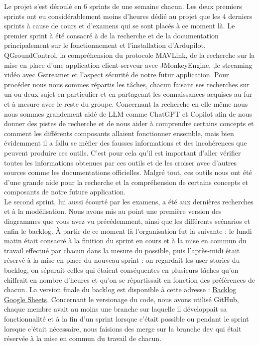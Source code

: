 \documentclass{scrartcl}
\begin{document}
Le projet s'est déroulé en 6 sprints de une semaine chacun. Les deux premiers sprints ont eu considérablement moins
d'heures dédié au projet que les 4 derniers sprints à cause de cours et d'examens qui se sont placés à ce moment là.
Le premier sprint à été consacré à de la recherche et de la documentation principalement sur le fonctionnement et l'installation d'Ardupilot, QGroundControl,
la compréhension du protocole MAVLink, de la recherche sur la mise en place d'une application client-serveur avec JMonkeyEngine,
,le streaming vidéo avec Gstreamer et l'aspect sécurité de notre futur application. Pour procéder nous nous sommes répartis les tâches, chacun faisant ses recherches
sur un ou deux sujet en particulier et en partageant les connaissances acquises au fur et à mesure avec le reste du groupe.
Concernant la recherche en elle même nous nous sommes grandement aidé de LLM comme ChatGPT et Copilot afin de nous donner des pistes de recherche et de
nous aider à comprendre certains concepts et comment les différents composants allaient fonctionner ensemble, mais bien évidemment il a fallu se méfier
des fausses informations et des incohérences que peuvent produire ces outils. C'est pour cela qu'il est important d'aller vérifier toutes les informations
obtenues par ces outils et de les croiser avec d'autres sources comme les documentations officielles.
Malgré tout, ces outils nous ont été d'une grande aide pour la recherche et la compréhension de certains concepts et composants de notre future application.\\

Le second sprint, lui aussi écourté par les examens, a été aux dernières recherches et à la modélisation. Nous avons mis au point
une première version des diagrammes que vous avez vu précédemment, ainsi que les différents scénarios et enfin le backlog.
À partir de ce moment là l'organisation fut la suivante : le lundi matin était consacré à la finition du sprint en cours
et à la mise en commun du travail effectué par chacun dans la mesure du possible, puis l'après-midi était réservé à la mise en place du nouveau sprint : on regardait les
user stories du backlog, on séparait celles qui étaient conséquentes en plusieurs tâches qu'on chiffrait en nombre d'heures et qu'on se répartissait en fonction des
préférences de chacun. La version finale du backlog est disponible à cette adresse : \href{https://docs.google.com/spreadsheets/d/1_9b835ZHfRBKW2wKLp_8N-aMPw3WcvQoGiQM7r9oeu4/edit?usp=sharing}{Backlog Google Sheets}.
Concernant le versionage du code, nous avons utilisé GitHub, chaque membre avait au moins une branche sur laquelle il développait sa fonctionnalité et à la fin d'un sprint lorsque c'était possible ou
pendant le sprint lorsque c'était nécessaire, nous faisions des merge sur la branche dev qui était réservée à la mise en commun du travail de chacun.\\
\end{document}
